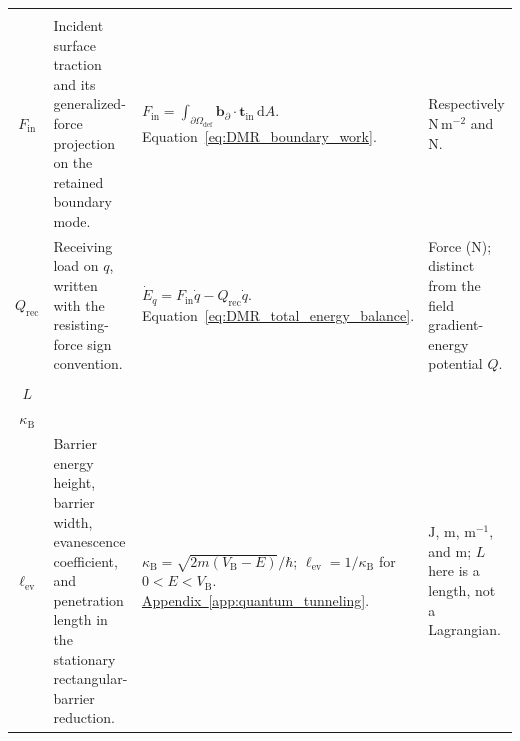 \begin{longtable}{@{} c p{5.5cm} p{4cm} p{3.5cm} @{}}
\begin{tabular}[c]{@{}c@{}}$\mathbf t_{\mathrm{in}}$ \\ $F_{\mathrm{in}}$\end{tabular} & {\raggedright Incident surface traction and its generalized-force projection on the retained boundary mode.\par} & {\raggedright $\displaystyle F_{\mathrm{in}}=\int_{\partial\Omega_{\mathrm{def}}}\mathbf b_\partial\!\cdot\!\mathbf t_{\mathrm{in}}\,\mathrm dA$. \newline Equation~\eqref{eq:DMR_boundary_work}.\par} & {\raggedright Respectively $\mathrm{N\,m^{-2}}$ and $\mathrm N$.\par} \\

$Q_{\mathrm{rec}}$ & {\raggedright Receiving load on $q$, written with the resisting-force sign convention.\par} & {\raggedright $\dot E_q=F_{\mathrm{in}}\dot q-Q_{\mathrm{rec}}\dot q$. \newline Equation~\eqref{eq:DMR_total_energy_balance}.\par} & {\raggedright Force ($\mathrm N$); distinct from the field gradient-energy potential $Q$.\par} \\

\begin{tabular}[c]{@{}c@{}}$V_{\mathrm B}$ \\ $L$ \\ $\kappa_{\mathrm B}$ \\ $\ell_{\mathrm{ev}}$\end{tabular} & {\raggedright Barrier energy height, barrier width, evanescence coefficient, and penetration length in the stationary rectangular-barrier reduction.\par} & {\raggedright $\kappa_{\mathrm B}=\sqrt{2m(V_{\mathrm B}-E)}/\hbar$; $\ell_{\mathrm{ev}}=1/\kappa_{\mathrm B}$ for $0<E<V_{\mathrm B}$. \newline \hyperref[app:quantum_tunneling]{Appendix~\ref*{app:quantum_tunneling}}.\par} & {\raggedright $\mathrm J$, $\mathrm m$, $\mathrm{m^{-1}}$, and $\mathrm m$; $L$ here is a length, not a Lagrangian.\par} \\


\end{longtable}
